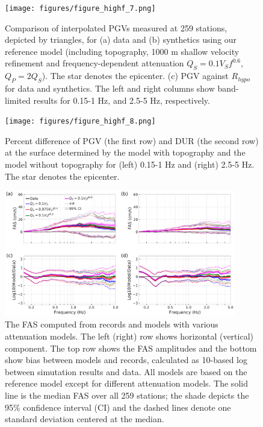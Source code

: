 \begin{figure}[!ht]
  \centering
  \texttt{[image: figures/figure\_highf\_7.png]}
  \caption{Comparison of interpolated PGVs measured at 259 stations, depicted by triangles, for (a) data and (b) synthetics using our reference model (including topography, 1000 m shallow velocity refinement and frequency-dependent attenuation $Q_S=0.1V_Sf^{0.6}$, $Q_P=2Q_S$). The star denotes the epicenter. (c) PGV against $R_{hypo}$ for data and synthetics. The left and right columns show band-limited results for 0.15-1 Hz, and 2.5-5 Hz, respectively.
  }
  \label{fig:highf-7}
\end{figure}
\clearpage

\begin{figure}[!ht]
  \centering
  \texttt{[image: figures/figure\_highf\_8.png]}
  \caption{Percent difference of PGV (the first row) and DUR (the second row) at the surface determined by the model with topography and the model without topography for (left) 0.15-1 Hz and (right) 2.5-5 Hz. The star denotes the epicenter.
  }
  \label{fig:highf-8}
\end{figure}
\clearpage

\begin{figure}[!ht]
  \centering
  \includegraphics[width=0.9\textwidth,height=0.9\textheight,keepaspectratio]{figures/figure_highf_9.pdf}
  \caption{The FAS computed from records and models with various attenuation models. The left (right) row shows horizontal (vertical) component. The top row shows the FAS amplitudes and the bottom show bias between models and records, calculated as 10-based log between simutation results and data. All models are based on the reference model except for different attenuation models. The solid line is the median FAS over all 259 stations; the shade depicts the 95\% confidence interval (CI) and the dashed lines denote one standard deviation centered at the median.
  }
  \label{fig:highf-9}
\end{figure}
\clearpage

